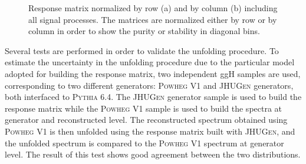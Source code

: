 \begin{figure}[htb]
\centering
{}
\caption{Response matrix normalized by row (a) and  by column (b) including all signal processes. The matrices are normalized either by row or by column in order to show the purity or stability in diagonal bins.}\label{fig:matrix}
\end{figure}

Several tests are performed in order to validate the unfolding procedure. To estimate the uncertainty in the unfolding procedure due to the
particular model adopted for building the response matrix, two independent ggH samples are used, corresponding to two different generators: \textsc{Powheg V1} and \textsc{JHUGen} generators, both interfaced to \textsc{Pythia 6.4}.
The \textsc{JHUGen} generator sample is used to build the response matrix while the
\textsc{Powheg V1} sample is used to build the \pth spectra at generator and reconstructed level. The reconstructed spectrum obtained using \textsc{Powheg V1} is then unfolded using the response matrix built with \textsc{JHUGen}, and the unfolded spectrum is compared to the \textsc{Powheg V1} spectrum at generator level. The result of this test shows good agreement between the two distributions.

